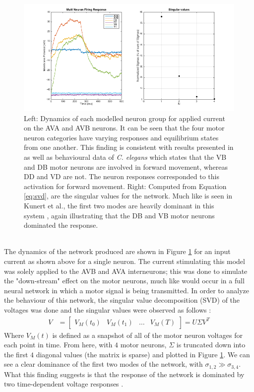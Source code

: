 \documentclass[11pt]{article} %
\begin{document}
\begin{figure}[h!]
\begin{center}
\includegraphics[scale=0.45]{motn_fig4.png} \caption[h4]{Left: Dynamics of each modelled neuron group for applied current on the AVA and AVB neurons. It can be seen that the four motor neuron categories have varying responses and equilibrium states from one another. This finding is consistent with results presented in \cite{Kunert2014} as well as behavioural data of \emph{C. elegans} \cite{Iwasaki2004} which states that the VB and DB motor neurons are involved in forward movement, whereas DD and VD are not. The neuron responses corresponded to this activation for forward movement. Right: Computed from Equation \ref{eq:svd}, are the singular values for the network. Much like is seen in Kunert et al., the first two modes are heavily dominant in this system \cite{Kunert2014}, again illustrating that the DB and VB motor neurons dominated the response.} \label{fig:f4} \end{center}
\end{figure}
\\

The dynamics of the network produced are shown in Figure \ref{fig:f4} for an input current as shown above for a single neuron. The current stimulating this model was solely applied to the AVB and AVA interneurons; this was done to simulate the "down-stream" effect on the motor neurons, much like would occur in a full neural network in which a motor signal is being transmitted. In order to analyze the behaviour of this network, the singular value decomposition (SVD) of the voltages was done and the singular values were observed as follows \cite{Kunert2014}:
\begin{align} \label{eq:svd}
V &= \begin{bmatrix}V_M(t_0) & V_M(t_1) & \hdots & V_M(T)\end{bmatrix} = U \Sigma V^T 
\end{align}
Where $V_M(t)$ is defined as a snapshot of all of the motor neuron voltages for each point in time. From here, with $4$ motor neurons, $\Sigma$ is truncated down into the first $4$ diagonal values (the matrix is sparse) and plotted in Figure \ref{fig:f4}. We can see a clear dominance of the first two modes of the network, with $\sigma_{1,2} \gg \sigma_{3,4}$. What this finding suggests is that the response of the network is dominated by two time-dependent voltage responses \cite{Kunert2014}.
\end{document}
